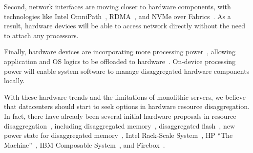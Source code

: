 \documentclass[10pt,times,twocolumn]{z2-article}
\begin{document}
Second, network interfaces are moving closer to hardware components,
with technologies like Intel OmniPath~\cite{OmniPath},
RDMA~\cite{ibverbs},
and NVMe over Fabrics~\cite{NVMe-fabrics-Inteltalk,NVMe-fabrics}.
As a result, hardware devices will be able to access network directly 
without the need to attach any processors. 

Finally, hardware devices are incorporating more processing power~\cite{Ahn15-PIM,Bojnordi12,Mellanox-SmartNIC,Mellanox-SmartNIC2,Agilio-SmartNIC,Junwhan-ISCA17},
allowing application and OS logics to be offloaded to hardware~\cite{Willow,Kaufmann16-ASPLOS}.
On-device processing power will enable system software to manage disaggregated hardware components locally.

With these hardware trends and the limitations of monolithic servers,
we believe that datacenters should start to seek options in hardware resource disaggregation.
In fact, there have already been several initial hardware proposals in resource disaggregation~\cite{OCP},
including disaggregated memory~\cite{Lim09-disaggregate}, 
disaggregated flash~\cite{FlashDisaggregation,ReFlex},
new power state for disaggregated memory~\cite{Nitu18-EUROSYS},
Intel Rack-Scale System~\cite{IntelRackScale}, 
HP ``The Machine''~\cite{HP-TheMachine,HP-MemoryOS}, 
IBM Composable System~\cite{IBM-Composable},
and Firebox~\cite{FireBox-FASTKeynote}.
\end{document}
